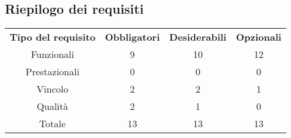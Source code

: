 \subsection{Riepilogo dei requisiti}
\begin{table}[h]
\centering
\begin{tabular}{| c | c | c | c |}
		\rowcolor{LightBlue}
		\color{white}\bfseries Tipo del requisito & \color{white}\bfseries Obbligatori & \color{white}\bfseries Desiderabili & \color{white}\bfseries Opzionali \\[0.25cm]
		 Funzionali & 9 & 10 & 12 \\
		 Prestazionali & 0 & 0 & 0 \\
		 Vincolo & 2 & 2 & 1 \\
		 Qualità & 2 & 1 & 0 \\
		 Totale & 13 & 13 & 13 \\ \hline
\end{tabular}
\end{table}